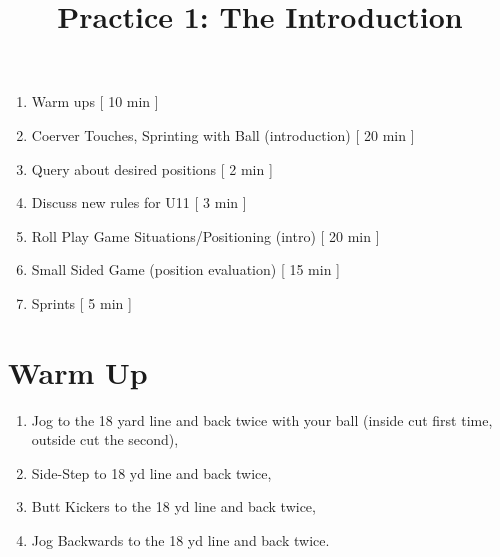 \documentclass[10pt,letterpaper]{article}
\title{Practice 1: The Introduction}
\author{}
\date{}
\newenvironment{agendablock}[1]{%
    \tcolorbox[beamer,%
    noparskip,breakable,
    colback=LightGray,colframe=DarkGray,%
    colbacklower=Gray!75!LightGray,%
    title=#1]}%
    {\endtcolorbox}
\newenvironment{myalertblock}[1]{%
    \tcolorbox[beamer,%
    noparskip,breakable,
    colback=LightCoral,colframe=DarkRed,%
    colbacklower=Tomato!75!LightCoral,%
    title=#1]}%
    {\endtcolorbox}
\begin{document}
\selectfont
\maketitle

\begin{agendablock}{Practice Activities}
    \begin{enumerate}
        \item Warm ups [ 10 min ]
        \item Coerver Touches, Sprinting with Ball (introduction) [ 20 min ]
        \item Query about desired positions [ 2 min ]
        \item Discuss new rules for U11 [ 3 min ]
        \item Roll Play Game Situations/Positioning (intro) [ 20 min ]
        \item Small Sided Game (position evaluation) [ 15 min ]
        \item Sprints [ 5 min ] 
    \end{enumerate}

\end{agendablock}

\section{Warm Up}

\begin{myalertblock}{Warm Ups (10 min) }
    \begin{enumerate}
        \item Jog to the 18 yard line and back twice with your ball (inside cut first time, outside cut the second),
        \item Side-Step to 18 yd line and back twice,
        \item Butt Kickers to the 18 yd line and back twice,
        \item Jog Backwards to the 18 yd line and back twice.
    \end{enumerate}
\end{myalertblock}
\end{document}
